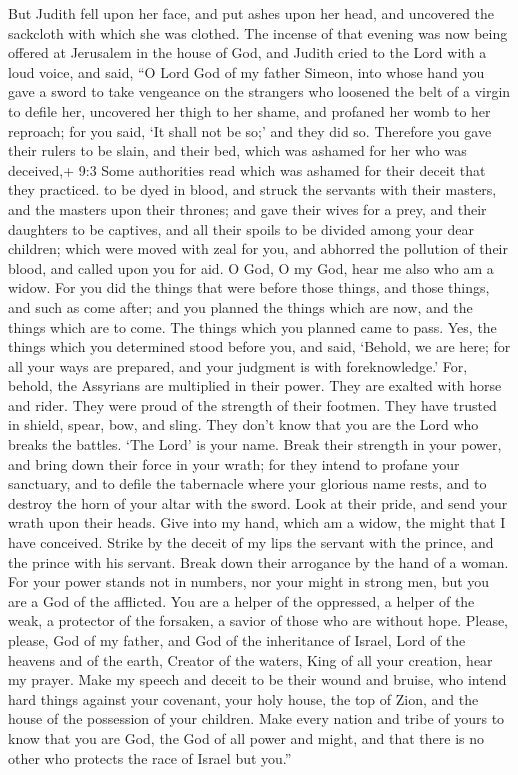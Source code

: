  But Judith fell upon her face, and put ashes upon her head,
and uncovered the sackcloth with which she was clothed. The incense of
that evening was now being offered at Jerusalem in the house of God, and
Judith cried to the Lord with a loud voice, and said,  ``O
Lord God of my father Simeon, into whose hand you gave a sword to take
vengeance on the strangers who loosened the belt of a virgin to defile
her, uncovered her thigh to her shame, and profaned her womb to her
reproach; for you said, `It shall not be so;' and they did so.
 Therefore you gave their rulers to be slain, and their bed,
which was ashamed for her who was deceived,+ 9:3 Some authorities read
which was ashamed for their deceit that they practiced. to be dyed in
blood, and struck the servants with their masters, and the masters upon
their thrones;  and gave their wives for a prey, and their
daughters to be captives, and all their spoils to be divided among your
dear children; which were moved with zeal for you, and abhorred the
pollution of their blood, and called upon you for aid. O God, O my God,
hear me also who am a widow.  For you did the things that
were before those things, and those things, and such as come after; and
you planned the things which are now, and the things which are to come.
The things which you planned came to pass.  Yes, the things
which you determined stood before you, and said, `Behold, we are here;
for all your ways are prepared, and your judgment is with
foreknowledge.'  For, behold, the Assyrians are multiplied
in their power. They are exalted with horse and rider. They were proud
of the strength of their footmen. They have trusted in shield, spear,
bow, and sling. They don't know that you are the Lord who breaks the
battles. `The Lord' is your name.  Break their strength in
your power, and bring down their force in your wrath; for they intend to
profane your sanctuary, and to defile the tabernacle where your glorious
name rests, and to destroy the horn of your altar with the sword.
 Look at their pride, and send your wrath upon their heads.
Give into my hand, which am a widow, the might that I have conceived.
 Strike by the deceit of my lips the servant with the
prince, and the prince with his servant. Break down their arrogance by
the hand of a woman.  For your power stands not in numbers,
nor your might in strong men, but you are a God of the afflicted. You
are a helper of the oppressed, a helper of the weak, a protector of the
forsaken, a savior of those who are without hope.  Please,
please, God of my father, and God of the inheritance of Israel, Lord of
the heavens and of the earth, Creator of the waters, King of all your
creation, hear my prayer.  Make my speech and deceit to be
their wound and bruise, who intend hard things against your covenant,
your holy house, the top of Zion, and the house of the possession of
your children.  Make every nation and tribe of yours to
know that you are God, the God of all power and might, and that there is
no other who protects the race of Israel but you.''

